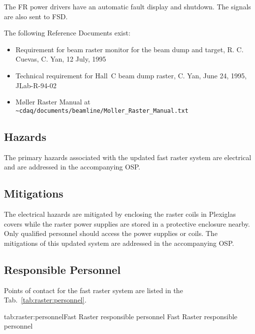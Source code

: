 {\begin{safetyen}{0}{0}
\noindent The FR power drivers have an automatic fault display and
shutdown. The signals are also sent to FSD.

The following Reference Documents exist:
\begin{itemize}
\item{Requirement for beam raster monitor for the beam dump and target,
R. C. Cuevas, C. Yan, 12 July, 1995}
\item{Technical requirement for Hall~C beam dump raster,
C. Yan, June 24, 1995, JLab-R-94-02}
\item{M\o ller Raster Manual at \nolinkurl{~cdaq/documents/beamline/Moller_Raster_Manual.txt}}
\end{itemize}

\subsection{Hazards}

The primary hazards associated with the updated fast raster system
are electrical and are addressed in the accompanying OSP.

\subsection{Mitigations}

The electrical hazards are mitigated by enclosing the raster coils
in Plexiglas covers while the raster power supplies are stored in a protective
enclosure nearby. Only qualified personnel should access the power supplies
or coils. The mitigations of this updated system are addressed in the
accompanying OSP.

\subsection{Responsible Personnel}

Points of contact for the fast raster system are listed in the Tab.~\ref{tab:raster:personnel}.
\begin{namestab}{tab:raster:personnel}{Fast Raster responsible personnel}{%
          Fast Raster responsible personnel}
\end{namestab}
\end{safetyen}

}
